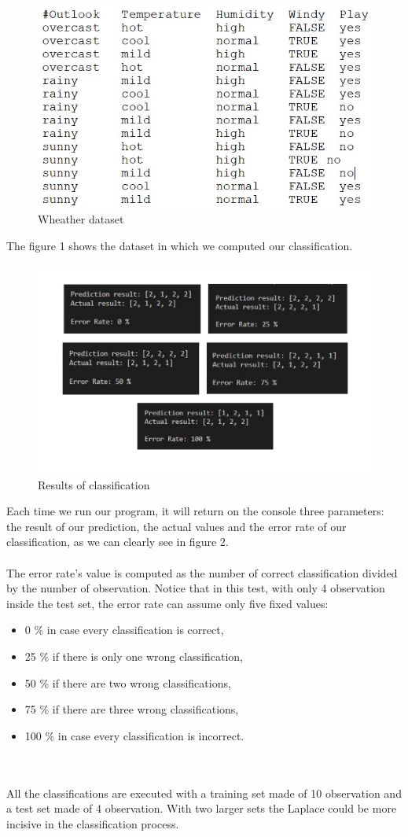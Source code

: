 \documentclass[10pt]{article}
\begin{document}
\begin{figure}[h] 
	\centering
	\includegraphics[width=0.9\columnwidth]{wheter.jpg} %
	\caption{Wheather dataset}
\end{figure}
The figure 1 shows the dataset in which we computed our classification.

\begin{figure}[h] 
	\centering
	\includegraphics[width=1.0\columnwidth]{template/total.jpg} %
 \caption{Results of classification}
\end{figure}
Each time we run our program, it will return on the console three parameters: the result of our prediction, the actual values and the error rate of our classification, as we can clearly see in figure 2.
\\\\ The error rate's value
is computed as the number of correct classification divided by
the number of observation. Notice that in this test, with only 4
observation inside the test set, the error rate can assume only
five fixed values:
\begin{itemize}
 \item  0 \% in case every classification is correct,
 \item 25 \% if there is only one wrong classification,
 \item 50 \% if there are two wrong classifications,
 \item 75 \% if there are three wrong classifications,
\item 100 \% in case every classification is incorrect.

 \end{itemize}

 \\\\
 All the classifications are executed with a training set made
of 10 observation and a test set made of 4 observation. With
two larger sets the Laplace could be more incisive in the
classification process.
\end{document}
